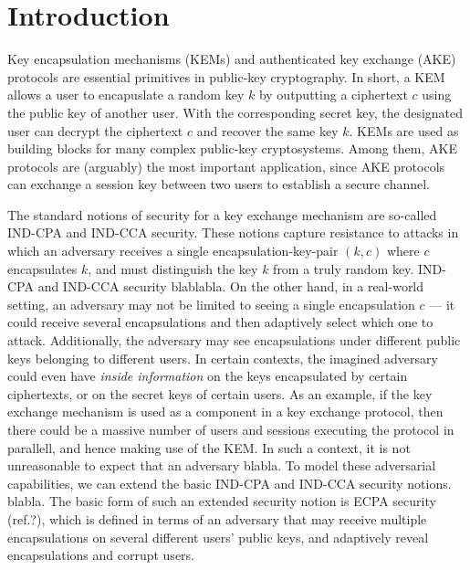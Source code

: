 
\section{Introduction}
Key encapsulation mechanisms (KEMs) and authenticated key exchange (AKE) protocols are essential primitives in public-key cryptography.
In short, a KEM allows a user to encapuslate a random key $k$ by outputting a ciphertext $c$ using the public key of another user. 
With the corresponding secret key, the designated user can decrypt the ciphertext \(c\) and recover the same key $k$.
KEMs are used as building blocks for many complex public-key cryptosystems. Among them, AKE protocols are (arguably) the most important application, since AKE protocols can exchange a session key between two users to establish a secure channel. 


The standard notions of security for a key exchange mechanism are so-called IND-CPA and IND-CCA security.
These notions capture resistance to attacks in which an adversary receives a single
encapsulation-key-pair \((k,c)\) where \(c\) encapsulates \(k\),
and must distinguish the key \(k\) from a truly random key.
IND-CPA and IND-CCA security blablabla.
On the other hand, in a real-world setting,
an adversary may not be limited to seeing a single encapsulation \(c\)
--- it could receive several encapsulations and then adaptively select which one to attack.
Additionally, the adversary may see encapsulations under different public keys belonging to different users.
In certain contexts, the imagined adversary could even have \emph{inside information}
on the keys encapsulated by certain ciphertexts, or on the secret keys of certain users.
As an example, if the key exchange mechanism is used as a component in a key exchange protocol,
then there could be a massive number of users and sessions executing the protocol in parallell,
and hence making use of the KEM.
In such a context, it is not unreasonable to expect that an adversary blabla.
To model these adversarial capabilities,
we can extend the basic IND-CPA and IND-CCA security notions.
blabla.
The basic form of such an extended security notion is ECPA security (ref.?),
which is defined in terms of an adversary that may receive multiple encapsulations
on several different users' public keys, and adaptively reveal encapsulations and corrupt users.


